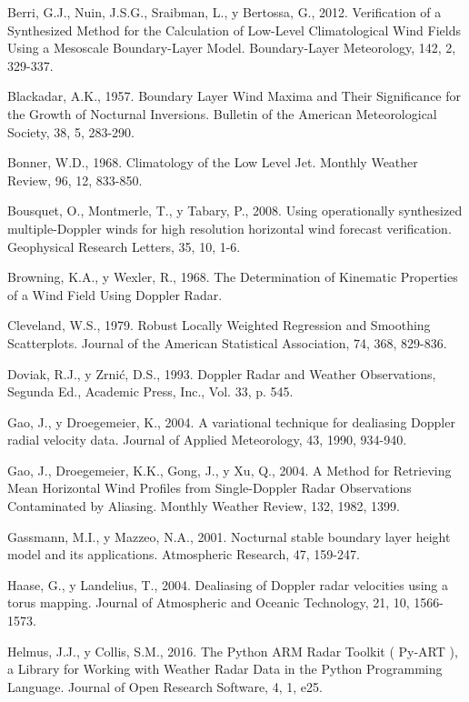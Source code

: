 \documentclass[12pt,spanish,oneside]{book}
\begin{document}
\hypertarget{ref-Berri2012}{}
Berri, G.J., Nuin, J.S.G., Sraibman, L., y Bertossa, G., 2012.
Verification of a Synthesized Method for the Calculation of Low-Level
Climatological Wind Fields Using a Mesoscale Boundary-Layer Model.
Boundary-Layer Meteorology, 142, 2, 329-337.

\hypertarget{ref-Blackadar1957}{}
Blackadar, A.K., 1957. Boundary Layer Wind Maxima and Their Significance
for the Growth of Nocturnal Inversions. Bulletin of the American
Meteorological Society, 38, 5, 283-290.

\hypertarget{ref-Bonner1968}{}
Bonner, W.D., 1968. Climatology of the Low Level Jet. Monthly Weather
Review, 96, 12, 833-850.

\hypertarget{ref-Bousquet2008}{}
Bousquet, O., Montmerle, T., y Tabary, P., 2008. Using operationally
synthesized multiple-Doppler winds for high resolution horizontal wind
forecast verification. Geophysical Research Letters, 35, 10, 1-6.

\hypertarget{ref-Browning1968}{}
Browning, K.A., y Wexler, R., 1968. The Determination of Kinematic
Properties of a Wind Field Using Doppler Radar.

\hypertarget{ref-Cleveland1979}{}
Cleveland, W.S., 1979. Robust Locally Weighted Regression and Smoothing
Scatterplots. Journal of the American Statistical Association, 74, 368,
829-836.

\hypertarget{ref-Doviak1993}{}
Doviak, R.J., y Zrnić, D.S., 1993. Doppler Radar and Weather
Observations, Segunda Ed., Academic Press, Inc., Vol. 33, p. 545.

\hypertarget{ref-Gao2004}{}
Gao, J., y Droegemeier, K., 2004. A variational technique for dealiasing
Doppler radial velocity data. Journal of Applied Meteorology, 43, 1990,
934-940.

\hypertarget{ref-Gao2004a}{}
Gao, J., Droegemeier, K.K., Gong, J., y Xu, Q., 2004. A Method for
Retrieving Mean Horizontal Wind Profiles from Single-Doppler Radar
Observations Contaminated by Aliasing. Monthly Weather Review, 132,
1982, 1399.

\hypertarget{ref-Gassmann2001}{}
Gassmann, M.I., y Mazzeo, N.A., 2001. Nocturnal stable boundary layer
height model and its applications. Atmospheric Research, 47, 159-247.

\hypertarget{ref-Haase2004}{}
Haase, G., y Landelius, T., 2004. Dealiasing of Doppler radar velocities
using a torus mapping. Journal of Atmospheric and Oceanic Technology,
21, 10, 1566-1573.

\hypertarget{ref-Helmus2016}{}
Helmus, J.J., y Collis, S.M., 2016. The Python ARM Radar Toolkit (
Py-ART ), a Library for Working with Weather Radar Data in the Python
Programming Language. Journal of Open Research Software, 4, 1, e25.
\end{document}
